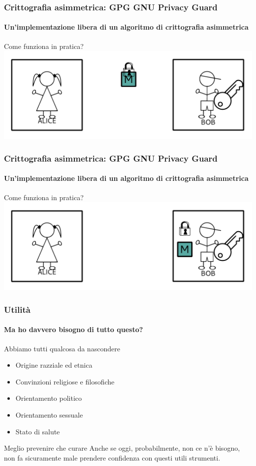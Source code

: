\documentclass{beamer}
\begin{document}
\begin{frame}
  \frametitle{Crittografia asimmetrica: GPG GNU Privacy Guard}
  \framesubtitle{Un'implementazione libera di un algoritmo di crittografia asimmetrica}

  \begin{block}{Come funziona in pratica?}
    \centering
    \includegraphics[width=.9\linewidth]{ab4.pdf}
  \end{block}
\end{frame}

\begin{frame}
  \frametitle{Crittografia asimmetrica: GPG GNU Privacy Guard}
  \framesubtitle{Un'implementazione libera di un algoritmo di crittografia asimmetrica}

  \begin{block}{Come funziona in pratica?}
    \centering
    \includegraphics[width=.9\linewidth]{ab5.pdf}
  \end{block}
\end{frame}

\begin{frame}
  \frametitle{Utilità}
  \framesubtitle{Ma ho davvero bisogno di tutto questo?}

  \begin{block}{Abbiamo tutti qualcosa da nascondere}
    \begin{itemize}
      \item Origine razziale ed etnica
      \item Convinzioni religiose e filosofiche
      \item Orientamento politico
      \item Orientamento sessuale
      \item Stato di salute
    \end{itemize}
  \end{block}

  \pause
  \begin{alertblock}{Meglio prevenire che curare}
    Anche se oggi, probabilmente, non ce n'è bisogno, non fa sicuramente
    male prendere confidenza con questi utili strumenti.
  \end{alertblock}
\end{frame}
\end{document}
